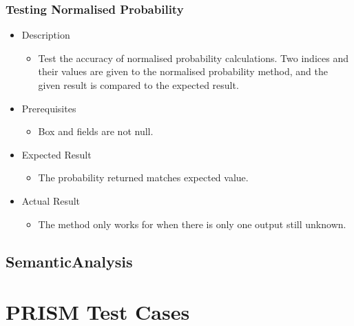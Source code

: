 \documentclass[report.tex]{subfiles}
\begin{document}

\subsubsection{Testing Normalised Probability} %
\label{ssub:testing_normalised_probability}
\begin{itemize}
    \item Description
    \begin{itemize}
        \item Test the accuracy of normalised probability calculations. Two
        indices and their values are given to the normalised probability method,
        and the given result is compared to the expected result.
    \end{itemize}
    \item Prerequisites
    \begin{itemize}
        \item Box and fields are not null.
    \end{itemize}
    \item Expected Result
    \begin{itemize}
        \item The probability returned matches expected value.
    \end{itemize}
    \item Actual Result
    \begin{itemize}
        \item The method only works for when there is only one output still
        unknown.
    \end{itemize}
\end{itemize}

\subsection{SemanticAnalysis} %
\label{sub:semanticanalysis}


\section{PRISM Test Cases} %
\label{sec:prism_test_cases}

\newpage
\end{document}
